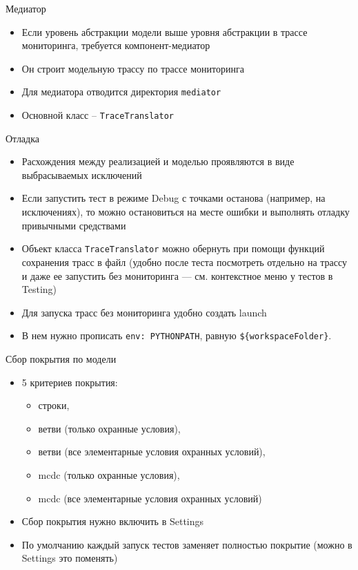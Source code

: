 \documentclass[hyperref={unicode=true}]{beamer}
\begin{document}
    \begin{frame}{Медиатор}
    \begin{itemize}
    \item Если уровень абстракции модели выше уровня абстракции в трассе
          мониторинга, требуется компонент-медиатор
    \item Он строит модельную трассу по трассе мониторинга
    \item Для медиатора отводится директория \texttt{mediator}
    \item Основной класс -- \texttt{TraceTranslator}
    \end{itemize}
    \end{frame}

    \begin{frame}{Отладка}
    \begin{itemize}
    \item Расхождения между реализацией и моделью проявляются
          в виде выбрасываемых исключений
    \item Если запустить тест в режиме Debug с точками останова (например,
          на исключениях), то можно остановиться на месте ошибки и
          выполнять отладку привычными средствами
    \item Объект класса \texttt{TraceTranslator} можно
          обернуть при помощи функций сохранения трасс в файл
          (удобно после теста посмотреть отдельно на трассу и даже ее запустить
          без мониторинга --- см. контекстное меню у тестов в Testing)
    \item Для запуска трасс без мониторинга удобно создать launch
    \item В нем нужно прописать \texttt{env: PYTHONPATH}, равную \texttt{\$\{workspaceFolder\}}.
    \end{itemize}
    \end{frame}

    \begin{frame}{Сбор покрытия по модели}
    \begin{itemize}
    \item 5 критериев покрытия:
		\begin{itemize}
                \item строки,
                \item ветви (только охранные условия),
                \item ветви (все элементарные
          условия охранных условий),
                \item mcdc (только охранные условия),
                \item mcdc (все элементарные
          условия охранных условий)
                \end{itemize}
    \item Сбор покрытия нужно включить в Settings
    \item По умолчанию каждый запуск тестов заменяет полностью покрытие
          (можно в Settings это поменять)
    \end{itemize}
    \end{frame}
\end{document}
